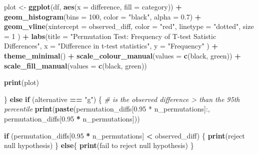\documentclass[
]{book}
\newenvironment{Shaded}{\begin{snugshade}}{\end{snugshade}}
\newcommand{\AttributeTok}[1]{\textcolor[rgb]{0.13,0.29,0.53}{#1}}
\newcommand{\CommentTok}[1]{\textcolor[rgb]{0.56,0.35,0.01}{\textit{#1}}}
\newcommand{\ControlFlowTok}[1]{\textcolor[rgb]{0.13,0.29,0.53}{\textbf{#1}}}
\newcommand{\DecValTok}[1]{\textcolor[rgb]{0.00,0.00,0.81}{#1}}
\newcommand{\FloatTok}[1]{\textcolor[rgb]{0.00,0.00,0.81}{#1}}
\newcommand{\FunctionTok}[1]{\textcolor[rgb]{0.13,0.29,0.53}{\textbf{#1}}}
\newcommand{\NormalTok}[1]{#1}
\newcommand{\OtherTok}[1]{\textcolor[rgb]{0.56,0.35,0.01}{#1}}
\newcommand{\SpecialCharTok}[1]{\textcolor[rgb]{0.81,0.36,0.00}{\textbf{#1}}}
\newcommand{\StringTok}[1]{\textcolor[rgb]{0.31,0.60,0.02}{#1}}
\begin{document}
\begin{Shaded}
\begin{Highlighting}[]
\NormalTok{    plot }\OtherTok{\textless{}{-}} \FunctionTok{ggplot}\NormalTok{(df, }\FunctionTok{aes}\NormalTok{(}\AttributeTok{x =}\NormalTok{ difference, }\AttributeTok{fill =}\NormalTok{ category)) }\SpecialCharTok{+}
        \FunctionTok{geom\_histogram}\NormalTok{(}\AttributeTok{bins =} \DecValTok{100}\NormalTok{,}
                        \AttributeTok{color =} \StringTok{"black"}\NormalTok{,}
                        \AttributeTok{alpha =} \FloatTok{0.7}\NormalTok{) }\SpecialCharTok{+}
        \FunctionTok{geom\_vline}\NormalTok{(}\AttributeTok{xintercept =}\NormalTok{ observed\_diff,}
                    \AttributeTok{color =} \StringTok{"red"}\NormalTok{,}
                    \AttributeTok{linetype =} \StringTok{"dotted"}\NormalTok{,}
                    \AttributeTok{size =} \DecValTok{1}
\NormalTok{                    ) }\SpecialCharTok{+}
        \FunctionTok{labs}\NormalTok{(}\AttributeTok{title =} \StringTok{"Permutation Test: Frequency of T{-}test Satistic Differences"}\NormalTok{,}
                \AttributeTok{x =} \StringTok{"Difference in t{-}test statistics"}\NormalTok{,}
                \AttributeTok{y =} \StringTok{"Frequency"}
\NormalTok{                ) }\SpecialCharTok{+}
        \FunctionTok{theme\_minimal}\NormalTok{() }\SpecialCharTok{+}
        \FunctionTok{scale\_colour\_manual}\NormalTok{(}\AttributeTok{values =} \FunctionTok{c}\NormalTok{(}\StringTok{\textquotesingle{}black\textquotesingle{}}\NormalTok{, }\StringTok{\textquotesingle{}green\textquotesingle{}}\NormalTok{)) }\SpecialCharTok{+}
        \FunctionTok{scale\_fill\_manual}\NormalTok{(}\AttributeTok{values =} \FunctionTok{c}\NormalTok{(}\StringTok{\textquotesingle{}black\textquotesingle{}}\NormalTok{, }\StringTok{\textquotesingle{}green\textquotesingle{}}\NormalTok{))}

  \FunctionTok{print}\NormalTok{(plot)}

\NormalTok{  \} }\ControlFlowTok{else} \ControlFlowTok{if}\NormalTok{ (alternative }\SpecialCharTok{==} \StringTok{"g"}\NormalTok{) \{}
    \CommentTok{\# is the observed difference \textgreater{} than the 95th percentile}
    \FunctionTok{print}\NormalTok{(}\FunctionTok{paste}\NormalTok{(}\StringTok{\textquotesingle{}permutation\_diffs[0.95 * n\_permutations]:\textquotesingle{}}\NormalTok{,}
\NormalTok{            permutation\_diffs[}\FloatTok{0.95} \SpecialCharTok{*}\NormalTok{ n\_permutations]))}

    \ControlFlowTok{if}\NormalTok{ (permutation\_diffs[}\FloatTok{0.95} \SpecialCharTok{*}\NormalTok{ n\_permutations] }\SpecialCharTok{\textless{}}\NormalTok{ observed\_diff) \{}
      \FunctionTok{print}\NormalTok{(}\StringTok{\textquotesingle{}reject null hypothesis\textquotesingle{}}\NormalTok{)}
\NormalTok{    \}}
    \ControlFlowTok{else}\NormalTok{\{}
      \FunctionTok{print}\NormalTok{(}\StringTok{\textquotesingle{}fail to reject null hypothesis\textquotesingle{}}\NormalTok{)}
\NormalTok{    \}}


\end{Highlighting}
\end{Shaded}
\end{document}
